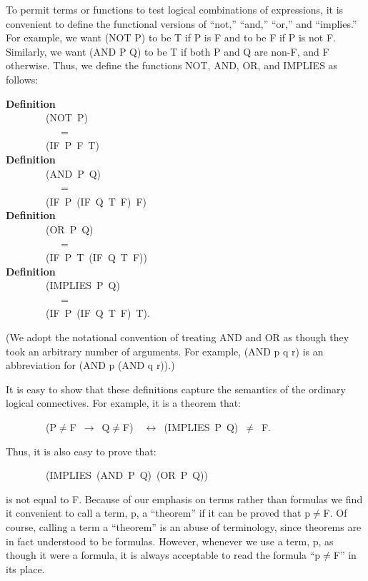 \documentclass[10pt]{book}
\newenvironment{pubasis}{\begin{flushleft}}{\end{flushleft}}
\newcommand{\axiomordefinition}[1]{\vspace{6pt}\Large\textsf{\textbf{#1}}\normalsize}
\begin{document}
To permit terms or functions to test logical combinations of expressions,
it is convenient to define the functional versions of ``not,'' ``and,'' ``or,'' and ``implies.''
For example, we want (NOT P) to be T if P is F and
to be F if P is not F.  Similarly, we want (AND P Q) to be T if both P and Q
are non-F, and F otherwise.
Thus, we define the functions NOT, AND, OR, and IMPLIES as follows:
\begin{pubasis}
\axiomordefinition{Definition}\\
~~~~~~~~(NOT~P)\\
~~~~~~~~~~~=\\
~~~~~~~~(IF~P~F~T)\\

\axiomordefinition{Definition}\\
~~~~~~~~(AND~P~Q)\\
~~~~~~~~~~~=\\
~~~~~~~~(IF~P~(IF~Q~T~F)~F)\\

\axiomordefinition{Definition}\\
~~~~~~~~(OR~P~Q)\\
~~~~~~~~~~~=\\
~~~~~~~~(IF~P~T~(IF~Q~T~F))\\

\axiomordefinition{Definition}\\
~~~~~~~~(IMPLIES~P~Q)\\
~~~~~~~~~~~=\\
~~~~~~~~(IF~P~(IF~Q~T~F)~T).\\
\end{pubasis}
(We adopt the notational convention of treating AND and OR as
though they took an arbitrary number of arguments.  For example,
(AND p q r) is an abbreviation for (AND p (AND q r)).)

It is easy to show that these definitions capture the semantics
of the ordinary logical
connectives.  For example, it is a theorem that:
\begin{pubasis}
~~~~~~~~(P$\neq$F~$\rightarrow$~Q$\neq$F)~~$\leftrightarrow$~(IMPLIES~P~Q)~$\neq$~F.\\
\end{pubasis}
Thus, it is also easy to prove that:
\begin{pubasis}
~~~~~~~~(IMPLIES~(AND~P~Q)~(OR~P~Q))\\
\end{pubasis}
is not equal to F.
Because of our emphasis on terms rather than formulas we find it
convenient to call a term, p, a ``theorem'' if it can be proved
that p$\neq$F.  Of course, calling a
term a ``theorem'' is an abuse of terminology, since
theorems are in fact understood to be formulas.
However, whenever we use a term, p,
as though it were a formula, it is always acceptable to read the formula ``p$\neq$F'' in its place.
\end{document}
